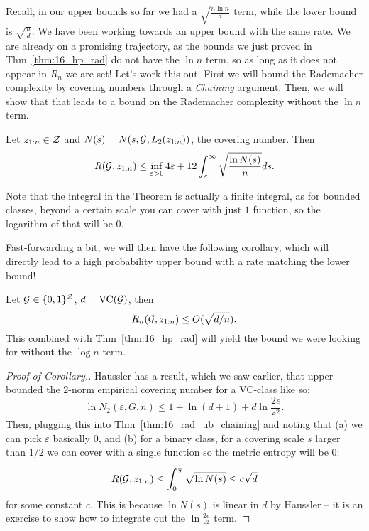 \documentclass[twoside]{article}
\newcommand{\zn}{z_{1:n}}
\begin{document}
Recall, in our upper bounds so far we had a $\sqrt{\frac{n \ln n}{d}}$ term, while the lower bound is $\sqrt{\frac{n}{d}}$. We have been working towards an upper bound with the same rate. We are already on a promising trajectory, as the bounds we just proved in Thm~\ref{thm:16_hp_rad} do not have the $\ln n$ term, so as long as it does not appear in $R_n$ we are set! Let's work this out. First we will bound the Rademacher complexity by covering numbers through a \textit{Chaining} argument. Then, we will show that that leads to a bound on the Rademacher complexity without the $\ln n$ term.

\begin{theorem} \label{thm:16_rad_ub_chaining}
    Let $\zn \in \cZ$ and $N(s) = N(s, \cG, L_2(\zn))$, the covering number. Then
    \begin{equation*}
        R(\cG, \zn) \leq \inf_{\varepsilon > 0} 4 \varepsilon + 12 \int_\eps^\infty \sqrt{ \frac{\ln N(s)}{n} } ds.
    \end{equation*}
\end{theorem}

Note that the integral in the Theorem is actually a finite integral, as for bounded classes, beyond a certain scale you can cover with just $1$ function, so the logarithm of that will be 0.

Fast-forwarding a bit, we will then have the following corollary, which will directly lead to a high probability upper bound with a rate matching the lower bound!

\begin{corollary}
    Let $\mathcal{G} \in \{0, 1\}^{\mathcal{Z}}$, $d = \mathrm{VC}(\mathcal{G})$, then
    \begin{equation*}
        R_n(\cG, \zn) \leq O(\sqrt{d/n}).
    \end{equation*}
    This combined with Thm~\ref{thm:16_hp_rad} will yield the bound we were looking for without the $\log n$ term.
\end{corollary}

\begin{proof}[Proof of Corollary.]
    Haussler has a result, which we saw earlier, that upper bounded the $2$-norm empirical covering number for a VC-class like so:
    $$
        \ln N_2(\varepsilon, G, n) \leq 1 + \ln(d+1) + d \ln \frac{2e}{\varepsilon^2}.
    $$
    Then, plugging this into Thm~\ref{thm:16_rad_ub_chaining} and noting that (a) we can pick $\varepsilon$ basically 0, and (b) for a binary class, for a covering scale $s$ larger than $1/2$ we can cover with a single function so the metric entropy will be $0$:
    $$
        R(\cG, \zn) \leq  \int_0^{\frac12}  \sqrt{ \ln N(s) } \leq c \sqrt{d} 
    $$
    for some constant $c$. This is because $\ln N(s)$ is linear in $d$ by Haussler -- it is an exercise to show how to integrate out the $\ln \frac{2e}{\varepsilon^2}$ term. 
\end{proof}
\end{document}
